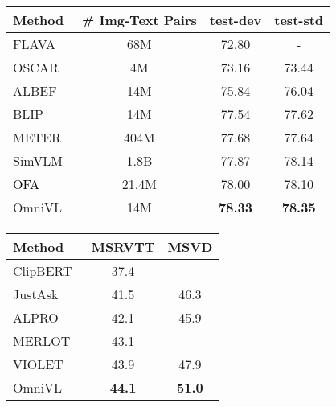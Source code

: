 \documentclass{article}
\makeatletter
\newcommand*{\system}{OmniVL\@\xspace}
\newcommand{\red}[1]{\textcolor{black}{#1}}
\makeatother
\begin{document}
\begin{table*}[!t]
\begin{minipage}[t]{0.58\linewidth}
\caption{Comparison with SOTA methods on VQA for visual question answering. }
  \label{tab:imgvqa}
  \small
  \vspace{0.01in}
\begin{tabular*}{\linewidth}{@{\extracolsep{\fill}}lccc@{}}
    \toprule
    \textbf{Method} & \textbf{\# Img-Text Pairs} & \textbf{test-dev} & \textbf{test-std} \\
    \midrule
    FLAVA~\cite{singh2021flava} & 68M & 72.80 & - \\
    OSCAR~\cite{li2020oscar} & 4M & 73.16 & 73.44 \\
    ALBEF~\cite{li2021align} & 14M & 75.84 & 76.04 \\
    BLIP~\cite{li2022blip} & 14M & 77.54 & 77.62 \\
    METER~\cite{dou2021empirical} & 404M & 77.68 & 77.64 \\
    SimVLM~\cite{wang2022simvlm} & 1.8B & 77.87 & 78.14 \\
    \red{OFA}~\cite{wang2022OFA} & 21.4M & 78.00 &	78.10 \\
    \system & 14M & \textbf{78.33} & \textbf{78.35} \\
  \bottomrule
\end{tabular*}
\end{minipage}
\hfill
\begin{minipage}[t]{0.4\linewidth}
\caption{Accuracy (\%) of video question answering on MSRVTT and MSVD.}
  \label{tab:vidqa}
  \small
  \vspace{0.05in}
\renewcommand{\arraystretch}{1.1}
    \begin{tabular*}{\linewidth}{@{\extracolsep{\fill}}lcc@{}}
    \toprule
    \textbf{Method} & \textbf{MSRVTT} & \textbf{MSVD} \\
    \midrule
    ClipBERT~\cite{lei2021less} & 37.4 & - \\
    JustAsk~\cite{yang2021just} & 41.5 & 46.3 \\
    ALPRO~\cite{li2021prompt} & 42.1 & 45.9 \\
    MERLOT~\cite{zellers2021merlot} & 43.1 & - \\
    VIOLET~\cite{fu2021violet} & 43.9 & 47.9 \\
    \system & \textbf{44.1} & \textbf{51.0} \\
  \bottomrule
\end{tabular*}
\end{minipage}
\end{table*}
\end{document}
